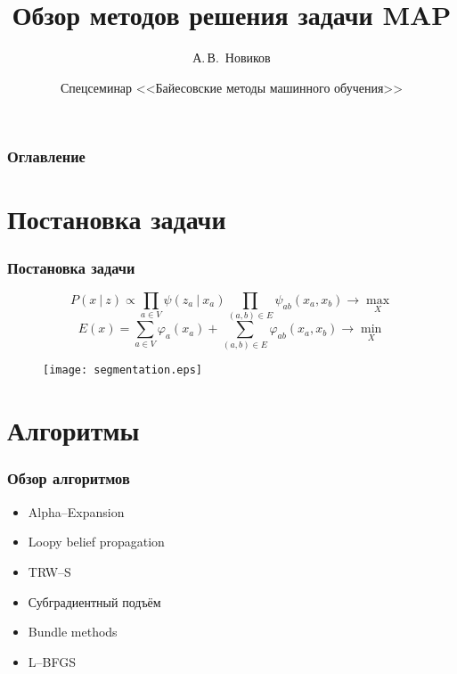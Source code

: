 \documentclass[smaller,unicode,hyperref={unicode=true}]{beamer}
\title{Обзор методов решения задачи MAP}
\author[Новиков]
{А.\,В.~Новиков\inst{1}}
\institute[МГУ ВМК]
{
  \inst{1}
  МГУ, ВМиК, каф. ММП
}
\date[Lecture 1]
{
  Спецсеминар <<Байесовские методы машинного обучения>>
}
\begin{document}
\begin{frame}
  \titlepage
\end{frame}
\begin{frame}
  \frametitle{Оглавление}
\tableofcontents[currentsection]
\end{frame}

\section[Задача]{Постановка задачи}
\begin{frame}
  \frametitle{Постановка задачи}
    \begin{equation*}
        P(x~|~z) \propto \prod_{a \in V} \psi (z_a~|~x_a) \prod_{(a,b) \in E} \psi_{ab} (x_{a}, x_{b}) \rightarrow \max_{X}
    \end{equation*}
    \begin{equation}
        E(x) = \sum_{a \in V} \varphi_a (x_a) + \sum_{(a,b) \in E} \varphi_{ab} (x_{a}, x_{b}) \rightarrow \min_{X}
    \end{equation}

    \begin{figure}
      \texttt{[image: segmentation.eps]}
    \end{figure}
\end{frame}

\section{Алгоритмы}
\begin{frame}
  \frametitle{Обзор алгоритмов}
    \begin{itemize}
      \item Alpha--Expansion
      \item Loopy belief propagation
      \item TRW--S~\cite{TRWS}
      \item Субградиентный подъём~\cite{Subgradient}
      \item Bundle methods~\cite{Bundle}
      \item L--BFGS
  \end{itemize}
\end{frame}
\end{document}
